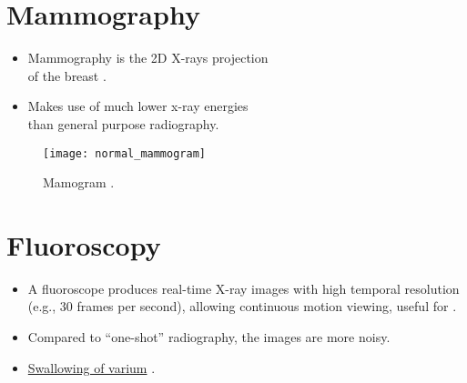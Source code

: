 \section{Mammography}
\begin{itemize}
\item Mammography is the 2D X-rays projection\\ of the breast
  \cite{bushberg2011essential}.
\item Makes use of much lower x-ray energies\\ than general purpose
  radiography.
\end{itemize}
\vspace{-24ex}
\begin{figure}[H]
  \begin{flushright}
    \texttt{[image: normal\_mammogram]}
    \end{flushright}
    \caption{Mamogram \cite{CDC_mammograms}.\label{fig:mamogram}}
\end{figure}

\section{Fluoroscopy}
\begin{itemize}
\item A fluoroscope produces real-time X-ray images with high temporal
  resolution (e.g., 30 frames per second), allowing continuous motion
  viewing, useful for 
  \cite{bushberg2011essential}.
\item Compared to ``one-shot'' radiography, the images are more noisy.
\item
  \href{https://en.wikipedia.org/wiki/Fluoroscopy#/media/File:Normal_barium_swallow_animation.gif}{Swallowing
    of varium} \cite{Wikipedia_Fluoroscopy}.
\end{itemize}

